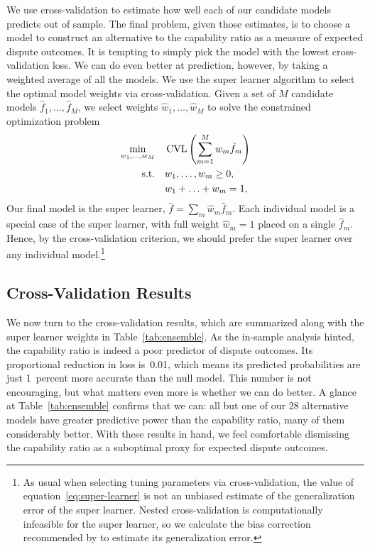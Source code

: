We use cross-validation to estimate how well each of our candidate models predicts out of sample.
The final problem, given those estimates, is to choose a model to construct an alternative to the capability ratio as a measure of expected dispute outcomes.
It is tempting to simply pick the model with the lowest cross-validation loss.
We can do even better at prediction, however, by taking a weighted average of all the models.
We use the super learner algorithm \citep{vanderLaan:bz} to select the optimal model weights via cross-validation.
Given a set of $M$ candidate models $\hat{f}_1, \ldots, \hat{f}_M$, we select weights $\hat{w}_1, \ldots, \hat{w}_M$ to solve the constrained optimization problem
\begin{equation}
  \label{eq:super-learner}
  \begin{aligned}
    \min_{w_1, \ldots, w_M}
    &\quad
    \operatorname{CVL} \left(
      \sum_{m=1}^M w_m \hat{f}_m
    \right)
    \\
    \mbox{s.t.}
    &\quad
    w_1, \ldots, w_m \geq 0,
    \\
    &\quad
    w_1 + \ldots + w_m = 1,
  \end{aligned}
\end{equation}
Our final model is the super learner, $\hat{f} = \sum_m \hat{w}_m \hat{f}_m$.
Each individual model is a special case of the super learner, with full weight $\hat{w}_m = 1$ placed on a single $\hat{f}_m$.
Hence, by the cross-validation criterion, we should prefer the super learner over any individual model.\footnote{%
  \label{fn:sl-bias}
  As usual when selecting tuning parameters via cross-validation, the value of equation~\eqref{eq:super-learner} is not an unbiased estimate of the generalization error of the super learner.
  Nested cross-validation is computationally infeasible for the super learner, so we calculate the bias correction recommended by \citet{Tibshirani:2009tz} to estimate its generalization error.
}

\subsection{Cross-Validation Results}

We now turn to the cross-validation results, which are summarized along with the super learner weights in Table~\ref{tab:ensemble}.
As the in-sample analysis hinted, the capability ratio is indeed a poor predictor of dispute outcomes.
Its proportional reduction in loss is~0.01, which means its predicted probabilities are just 1~percent more accurate than the null model.
This number is not encouraging, but what matters even more is whether we can do better.
A glance at Table~\ref{tab:ensemble} confirms that we can: all but one of our 28 alternative models have greater predictive power than the capability ratio, many of them considerably better.
With these results in hand, we feel comfortable dismissing the capability ratio as a suboptimal proxy for expected dispute outcomes.

